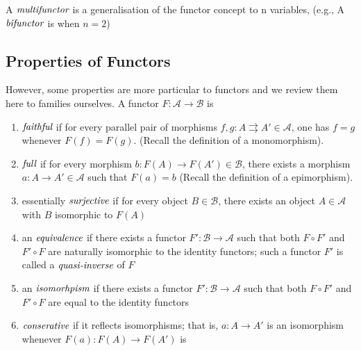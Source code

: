 \begin{defn}[Multifunctor]
 A $\emph{multifunctor}$ is a generalisation of the functor concept to n variables, (e.g., A $\emph{bifunctor}$ is when $n=2$)
\end{defn}

\subsection{Properties of Functors} %
\label{subsec:functorsproperties}
However, some properties are more particular to functors and we review them here to families ourselves.
A functor $F : \mathcal{A} \to \mathcal{B}$ is
\begin{enumerate}
 \item $\emph{faithful}$ if for every parallel pair of morphisms $f,g : A \rightrightarrows A' \in \mathcal{A}$, one has $f = g$ whenever $F(f) = F(g)$.
 (Recall the definition of a monomorphism).
 \item $\emph{full}$ if for every morphism $b: F(A) \to F(A') \in \mathcal{B}$, there exists a morphism $a: A \to A' \in \mathcal{A}$ such that $F(a) = b$
 (Recall the definition of a epimorphism).
 \item essentially $\emph{surjective}$ if for every object $B \in \mathcal{B}$, there exists an object $A \in \mathcal{A}$ with $B$ isomorphic to $F(A)$
 \item an $\emph{equivalence}$ if there exists a functor $F': \mathcal{B} \to \mathcal{A}$ such that both $F \circ F'$ and $F' \circ F$ are naturally
 isomorphic to the identity functors; such a functor $F'$ is called a $\emph{quasi-inverse}$ of $F$
 \item an $\emph{isomorhpism}$ if there exists a functor $F': \mathcal{B} \to \mathcal{A}$ such that both $F \circ F'$ and $F' \circ F$
 are equal to the identity functors
 \item $\emph{conserative}$ if it reflects isomorphisms; that is, $a: A \to A'$ is an isomorphism whenever $F(a): F(A) \to F(A')$ is
\end{enumerate}

